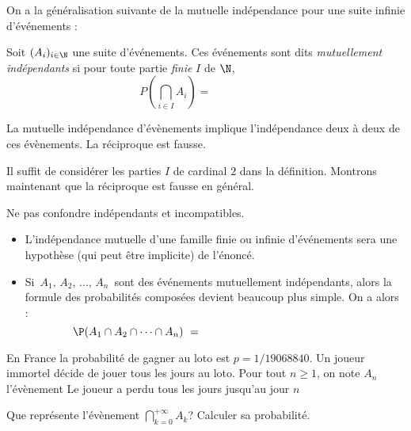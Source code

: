 \documentclass[a4paper,10pt]{report}
\begin{document}
\begin{itemize}
\begin{itemize}
 
On a la généralisation suivante de la mutuelle indépendance pour une suite infinie d'événements :

\begin{Definition}{}
 Soit $(A_i)_{i \in \N}$ une suite d'événements. Ces événements sont dits \emph{mutuellement indépendants} si  pour toute partie \emph{finie} $I$ de $\N$,
$$ P\left(\bigcap_{i \in I} A_i \right) = \phantom{\prod_{i\in I} P(A_i).}$$
\end{Definition}

\begin{Proposition}{} La mutuelle indépendance d'évènements implique l'indépendance deux à deux de ces évènements. La réciproque est fausse.
\end{Proposition}

\begin{Demonstration}{} Il suffit de considérer les parties $I$ de cardinal $2$ dans la définition. Montrons maintenant que la réciproque est fausse en général. 

\vspace{5cm}
\end{Demonstration}

\begin{att}
 Ne pas confondre indépendants et incompatibles.
\end{att}

\medskip

\begin{Remarques}{}
\begin{itemize}
 \item L'indépendance mutuelle d'une famille finie ou infinie d'événements sera une hypothèse (qui peut être implicite) de l'énoncé.
 \item Si $\,A_1,\,A_2,\,\dots,\,A_n\,$ sont des événements mutuellement indépendants, 
alors la formule des probabilités composées devient beaucoup plus simple. On a alors : 
$$ \P(A_1\cap A_2\cap \cdots\cap A_{n})\ = \phantom{ \P(A_1)\times \P(A_2)\times\cdots\times \P(A_{n})}$$
\end{itemize}
\end{Remarques}{}


\begin{Exemple} En France la probabilité de gagner au loto est $p=1/19 068 840$. Un joueur immortel décide de jouer tous les jours au loto. Pour tout $n \geq 1$, on note $A_n$ l'évènement \og Le joueur a perdu tous les jours jusqu'au jour $n$ \fg 

Que représente l'évènement $\bigcap_{k=0}^{+\infty\ }A_k$? Calculer sa probabilité.


\end{Exemple}
\end{itemize}
\end{itemize}
\end{document}
